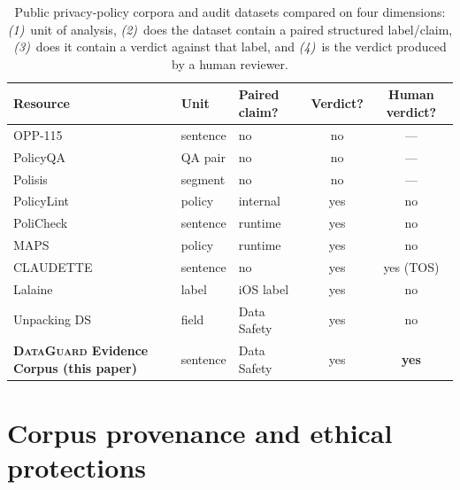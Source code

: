 \documentclass[11pt,a4paper]{article}
\newcommand{\dataguard}{\textsc{DataGuard}}
\begin{document}
\begin{table}[t]
\centering\small
\caption{Public privacy-policy corpora and audit datasets compared on
four dimensions: \emph{(1)}~unit of analysis,
\emph{(2)}~does the dataset contain a paired structured label/claim,
\emph{(3)}~does it contain a verdict against that label, and
\emph{(4)}~is the verdict produced by a human reviewer.}
\label{tab:related}
\begin{tabular}{lllcc}
\toprule
Resource & Unit & Paired claim? & Verdict? & Human verdict? \\
\midrule
OPP-115 \citep{wilson2016creation}            & sentence  & no  & no  & --- \\
PolicyQA \citep{ravichander2019question}      & QA pair   & no  & no  & --- \\
Polisis \citep{harkous2018polisis}            & segment   & no  & no  & --- \\
PolicyLint \citep{andow2019policylint}        & policy    & internal & yes & no \\
PoliCheck \citep{andow2020policheck}          & sentence  & runtime & yes & no \\
MAPS \citep{zimmeck2019maps}                  & policy    & runtime & yes & no \\
CLAUDETTE \citep{lippi2019claudette}          & sentence  & no  & yes & yes (TOS) \\
Lalaine \citep{xiao2023lalaine}               & label    & iOS label & yes & no \\
Unpacking DS \citep{khandelwal2024unpacking}  & field     & Data Safety & yes & no \\
\midrule
\textbf{\dataguard{} Evidence Corpus (this paper)} &
sentence & Data Safety & yes & \textbf{yes} \\
\bottomrule
\end{tabular}
\end{table}

\section{Corpus provenance and ethical protections}\label{sec:provenance}
\end{document}
